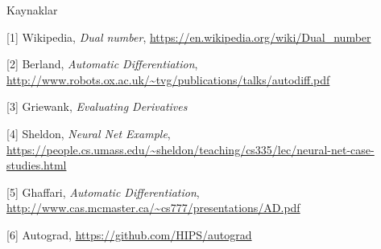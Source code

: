 \documentclass[12pt,fleqn]{article}\usepackage{../../common}
\begin{document}
Kaynaklar

[1] Wikipedia, {\em Dual number}, 
    \url{https://en.wikipedia.org/wiki/Dual_number}

[2] Berland, {\em Automatic Differentiation}, 
    \url{http://www.robots.ox.ac.uk/~tvg/publications/talks/autodiff.pdf}

[3] Griewank, {\em Evaluating Derivatives}

[4] Sheldon, {\em Neural Net Example}, 
    \url{https://people.cs.umass.edu/~sheldon/teaching/cs335/lec/neural-net-case-studies.html}

[5] Ghaffari, {\em Automatic Differentiation}, 
    \url{http://www.cas.mcmaster.ca/~cs777/presentations/AD.pdf}

[6] Autograd, \url{https://github.com/HIPS/autograd}
\end{document}
